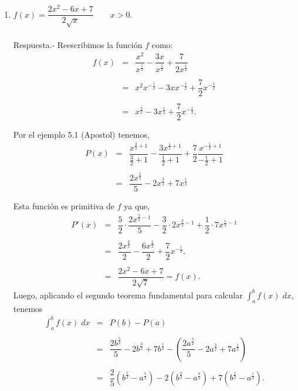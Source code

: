\begin{enumerate}[\bfseries 1.]
    \item $f(x)=\dfrac{2x^2-6x+7}{2\sqrt{x}}\qquad x>0$.\\\\
	Respuesta.-\; Reescribimos la función $f$ como:
	$$\begin{array}{rcl}
	    f(x)&=&\dfrac{x^2}{x^{\frac{1}{2}}}-\dfrac{3x}{x^{\frac{1}{2}}}+\dfrac{7}{2x^{\frac{1}{2}}}\\\\
		&=&x^2x^{-\frac{1}{2}}-3xx^{-\frac{1}{2}}+\dfrac{7}{2}x^{-\frac{1}{2}}\\\\
		&=&x^{\frac{3}{2}}-3x^{\frac{1}{2}}+\dfrac{7}{2}x^{-\frac{1}{2}}.\\\\
	\end{array}$$
	Por el ejemplo 5.1 (Apostol) tenemos,
	$$\begin{array}{rcl}
	    P(x)&=&\dfrac{x^{\frac{3}{2}+1}}{\frac{3}{2}+1}-\dfrac{3x^{\frac{1}{2}+1}}{\frac{1}{2}+1}+\dfrac{7}{2}\dfrac{x^{-\frac{1}{2}+1}}{-\frac{1}{2}+1}\\\\
		&=&\dfrac{2x^{\frac{5}{2}}}{5}-2x^{\frac{3}{2}}+7x^{\frac{1}{2}}\\\\
	\end{array}$$
    	Esta función es primitiva de $f$ ya que,
	$$\begin{array}{rcl}
	    P'(x)&=&\dfrac{5}{2}\cdot\dfrac{2x^{\frac{5}{2}-1}}{5}-\dfrac{3}{2}\cdot{2x^{\frac{3}{2}-1}}+\dfrac{1}{2}\cdot7x^{\frac{1}{2}-1}\\\\
		 &=&\dfrac{2x^{\frac{3}{2}}}{2}-\dfrac{6x^{\frac{1}{2}}}{2}+\dfrac{7}{2}x^{-\frac{1}{2}}.\\\\
		 &=&\dfrac{2x^2-6x+7}{2\sqrt{7}}=f(x).
	\end{array}$$
	Luego, aplicando el segundo teorema fundamental para calcular $\int_a^b f(x)\; dx$, tenemos
	$$\begin{array}{rcl}
	    \displaystyle\int_a^b f(x)\; dx &=& P(b)-P(a)\\\\
					    &=& \dfrac{2b^{\frac{5}{2}}}{5}-2b^{\frac{3}{2}}+7b^{\frac{1}{2}}-\left(\dfrac{2a^{\frac{5}{2}}}{5}-2a^{\frac{3}{2}}+7a^{\frac{1}{2}}\right)\\\\
					    &=&\dfrac{2}{5}\left(b^{\frac{5}{2}}-a^{\frac{5}{2}}\right)-2\left(b^{\frac{3}{2}}-a^{\frac{3}{2}}\right)+7\left(b^{\frac{1}{2}}-a^{\frac{1}{2}}\right).
	\end{array}$$
	\vspace{0.5cm}


\end{enumerate}
